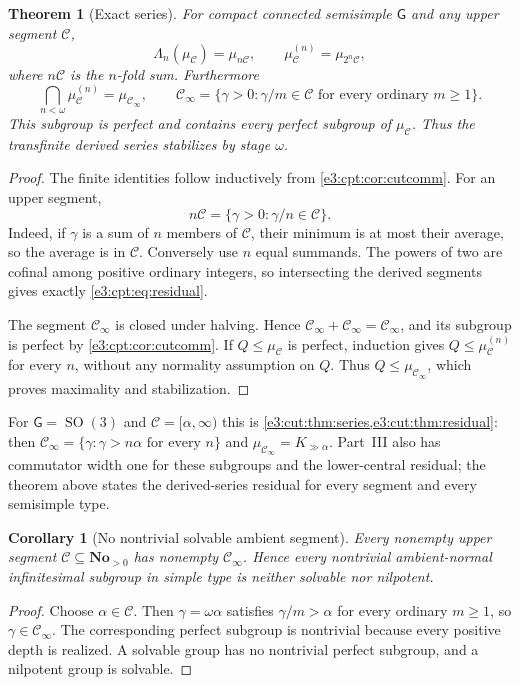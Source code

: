 \documentclass[11pt,letterpaper]{article}
\numberwithin{equation}{section}
\newtheorem{theorem}{Theorem}[section]
\newtheorem{corollary}[corollary]{Corollary}
\theoremstyle{definition}
\theoremstyle{remark}
\newcommand{\No}{\mathbf{No}}
\newcommand{\SO}{\operatorname{SO}}
\newcommand{\sG}{\mathsf G}
\begin{document}
\begin{theorem}[Exact series]\label{e3:cpt:thm:series}
For compact connected semisimple $\sG$ and any upper segment $\mathcal C$,
\[
 \Lambda_n(\mu_{\mathcal C})=\mu_{n\mathcal C},\qquad
 \mu_{\mathcal C}^{(n)}=\mu_{2^n\mathcal C},
\]
where $n\mathcal C$ is the $n$-fold sum. Furthermore
\begin{equation}\label{e3:cpt:eq:residual}
 \bigcap_{n<\omega}\mu_{\mathcal C}^{(n)}=\mu_{\mathcal C_\infty},\qquad
 \mathcal C_\infty=
 \{\gamma>0:\gamma/m\in\mathcal C\text{ for every ordinary }m\ge1\}.
\end{equation}
This subgroup is perfect and contains every perfect subgroup of
$\mu_{\mathcal C}$. Thus the transfinite derived series stabilizes by stage
$\omega$.
\end{theorem}
\begin{proof}
The finite identities follow inductively from \cref{e3:cpt:cor:cutcomm}. For an
upper segment,
\begin{equation}\label{e3:cpt:eq:cut-average}
 n\mathcal C=\{\gamma>0:\gamma/n\in\mathcal C\}.
\end{equation}
Indeed, if $\gamma$ is a sum of $n$ members of $\mathcal C$, their minimum is at
most their average, so the average is in $\mathcal C$. Conversely use $n$ equal
summands. The powers of two are cofinal among positive ordinary integers, so
intersecting the derived segments gives exactly \cref{e3:cpt:eq:residual}.

The segment $\mathcal C_\infty$ is closed under halving. Hence
$\mathcal C_\infty+\mathcal C_\infty=\mathcal C_\infty$, and its subgroup is
perfect by \cref{e3:cpt:cor:cutcomm}. If $Q\le\mu_{\mathcal C}$ is perfect,
induction gives $Q\le\mu_{\mathcal C}^{(n)}$ for every $n$, without any
normality assumption on $Q$. Thus $Q\le\mu_{\mathcal C_\infty}$, which proves
maximality and stabilization.
\end{proof}

For $\sG=\SO(3)$ and $\mathcal C=[\alpha,\infty)$ this is
\cref{e3:cut:thm:series,e3:cut:thm:residual}: then
$\mathcal C_\infty=\{\gamma:\gamma>n\alpha\text{ for every }n\}$ and
$\mu_{\mathcal C_\infty}=K_{\gg\alpha}$. Part~III also has commutator width one
for these subgroups and the lower-central residual; the theorem above states
the derived-series residual for every segment and every semisimple type.

\begin{corollary}[No nontrivial solvable ambient segment]\label{e3:cpt:cor:nonsolvable}
Every nonempty upper segment $\mathcal C\subseteq\No_{>0}$ has nonempty
$\mathcal C_\infty$. Hence every nontrivial ambient-normal infinitesimal
subgroup in simple type is neither solvable nor nilpotent.
\end{corollary}
\begin{proof}
Choose $\alpha\in\mathcal C$. Then $\gamma=\omega\alpha$ satisfies
$\gamma/m>\alpha$ for every ordinary $m\ge1$, so $\gamma\in\mathcal C_\infty$.
The corresponding perfect subgroup is nontrivial because every positive depth
is realized. A solvable group has no nontrivial perfect subgroup, and a
nilpotent group is solvable.
\end{proof}
\end{document}
